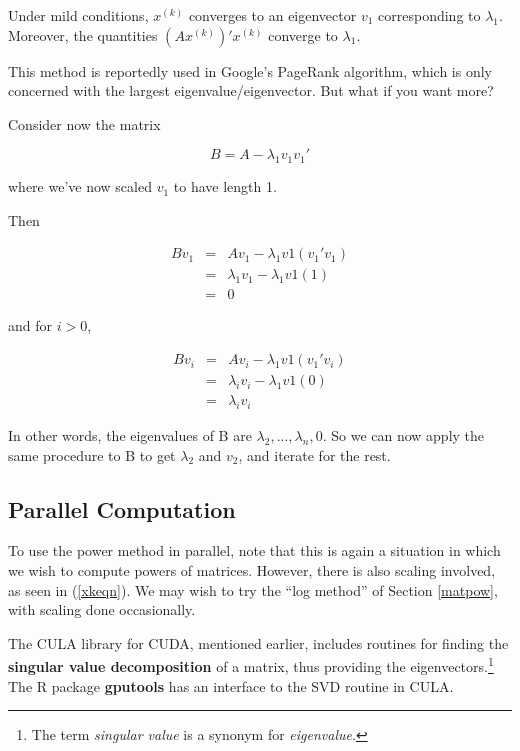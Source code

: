 Under mild conditions, $x^{(k)}$ converges to an eigenvector $v_1$
corresponding to $\lambda_1$.  Moreover, the quantities
$(Ax^{(k)})' x^{(k)}$ converge to $\lambda_1$.

This method is reportedly used in Google's PageRank algorithm, which is
only concerned with the largest eigenvalue/eigenvector.  But what if you
want more?

Consider now the matrix

\begin{equation}
B = A - \lambda_1 v_1 v_1'
\end{equation}

where we've now scaled $v_1$ to have length 1.

Then

\begin{eqnarray}
B v_1 &=& A v_1 - \lambda_1 v1 (v_1' v_1) \\
&=&
\lambda_1 v_1 - \lambda_1 v1 (1) \\
&=& 0
\end{eqnarray}

and for $i > 0$,

\begin{eqnarray}
B v_i &=& A v_i - \lambda_1 v1 (v_1' v_i) \\
&=& \lambda_i v_i - \lambda_1 v1 (0) \\
&=& \lambda_i v_i 
\end{eqnarray}

In other words, the eigenvalues of B are $\lambda_2,...,\lambda_n,0$.
So we can now apply the same procedure to B to get $\lambda_2$ and
$v_2$, and iterate for the rest.

\subsection{Parallel Computation}

To use the power method in parallel, note that this is again a situation
in which we wish to compute powers of matrices.  However, there is also
scaling involved, as seen in (\ref{xkeqn}).  We may wish to try the
``log method'' of Section \ref{matpow}, with scaling done occasionally.

The CULA library for CUDA, mentioned earlier, includes routines for
finding the {\bf singular value decomposition} of a matrix, thus
providing the eigenvectors.\footnote{The term {\it singular value} is a
synonym for {\it eigenvalue}.}  The R package {\bf gputools} has an
interface to the SVD routine in CULA.

